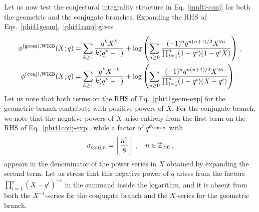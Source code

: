 \documentclass[a4paper,11pt]{article}
\theoremstyle{definition}
\def\IZ{{\mathbb Z}}
\newcommand{\be}{\begin{equation}}
\newcommand{\ee}{\end{equation}}
\begin{document}
Let us now test the conjectural integrality structure in Eq.~\eqref{multi-conj} for both the geometric and the conjugate branches. 
Expanding the RHS of Eqs.~\eqref{phi41geom},~\eqref{phi41conj} gives
\begin{subequations}
\begin{align}
  \phi^{(\rm{geom}), \rm{WKB}}(X;q)& = \sum_{k \ge 1} \frac{q^k X^k}{k(q^k-1)} + \log \left(\sum_{n \ge 0} \frac{(-1)^n q^{n(n+1)/2} X^{2n}}{\prod_{i=1}^n (1-q^i) (1-q^i X)}  \right)  \, , \label{phi41geom-exp}\\
  \phi^{(\rm{conj}), \rm{WKB}}(X;q) &=  \sum_{k \ge 1} \frac{q^k X^{-k}}{k(q^k-1)} + \log \left(\sum_{n \ge 0}  \frac{ (-1)^n q^{n(n+1)/2} X^{2n}}{\prod_{i=1}^n (1-q^i) (X-q^i)} \right)  \, . \label{phi41conj-exp}
\end{align}
\end{subequations}
%
Let us note that both terms on the RHS of Eq.~\eqref{phi41geom-exp} for the geometric branch contribute with positive powers of $X$.
For the conjugate branch, we note that the negative powers of $X$ arise entirely from the first term on the RHS of Eq.~\eqref{phi41conj-exp}, while a factor of $q^{\sigma_{{\rm conj}, n}}$ with
\be \label{sigma41}
\sigma_{{\rm conj}, n} = \left\lfloor \frac{n^2}{8} \right\rfloor \, , \quad n \in \IZ_{>0} \, ,
\ee
appears in the denominator of the power series in $X$ obtained by expanding the second term. Let us stress that this negative power of $q$ arises from the factors $\prod_{i=1}^n(X-q^i)^{-1}$ in the summand inside the logarithm, and it is absent from both the $X^{-1}$-series for the conjugate branch and the $X$-series for the geometric branch.
\end{document}
